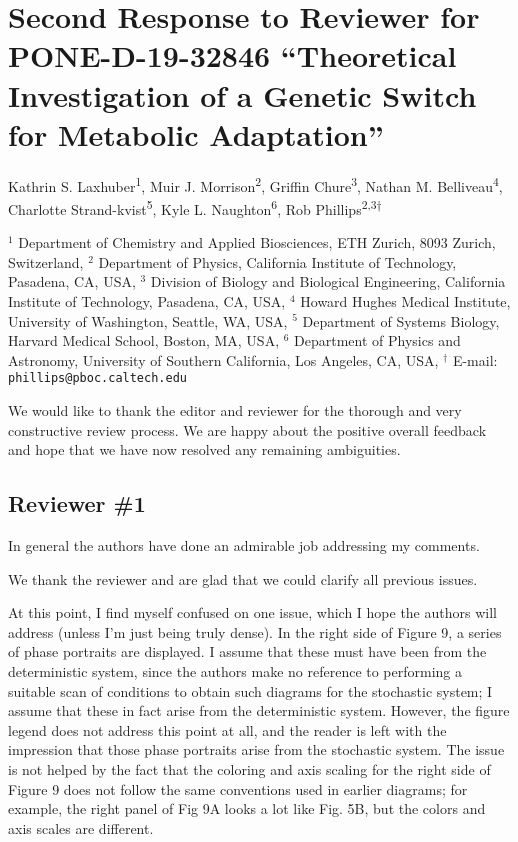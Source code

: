 \documentclass[11pt,letterpaper]{article}
\begin{document}
\section*{Second Response to Reviewer for PONE-D-19-32846 ``Theoretical Investigation of a Genetic Switch for Metabolic Adaptation''}
Kathrin S. Laxhuber\textsuperscript{1},
Muir J. Morrison\textsuperscript{2},
Griffin Chure\textsuperscript{3},
Nathan M. Belliveau\textsuperscript{4},
Charlotte Strand-kvist\textsuperscript{5},
Kyle L. Naughton\textsuperscript{6},
Rob Phillips\textsuperscript{2,3$\dagger$}
\vspace{10pt}

\noindent\tiny{
$^1$ Department of Chemistry and Applied Biosciences, ETH Zurich, 8093 Zurich, Switzerland,
$^2$ Department of Physics, California Institute of Technology, Pasadena, CA, USA,
$^3$ Division of Biology and Biological Engineering, California Institute of Technology, Pasadena, CA, USA,
$^4$ Howard Hughes Medical Institute, University of Washington, Seattle, WA, USA,
$^5$ Department of Systems Biology, Harvard Medical School, Boston, MA, USA,
$^6$ Department of Physics and Astronomy, University of Southern California, Los Angeles, CA, USA, $^\dagger$ E-mail: \texttt{phillips@pboc.caltech.edu}}

\begin{responseSummary}
We would like to thank the editor and reviewer for the thorough and very constructive review process. 
We are happy about the positive overall feedback and hope that we have now resolved any remaining ambiguities.
\end{responseSummary}

\subsection*{Reviewer \#1}
\begin{review}
	In general the authors have done an admirable job addressing my comments.
\end{review}

\begin{response}
	We thank the reviewer and are glad that we could clarify all previous issues.
\end{response}

\begin{review}
	At this point, I find myself confused on one issue, which I hope the authors will address (unless I'm just being truly dense). In the right side of Figure 9, a series of phase portraits are displayed. I assume that these must have been from the deterministic system, since the authors make no reference to performing a suitable scan of conditions to obtain such diagrams for the stochastic system; I assume that these in fact arise from the deterministic system. However, the figure legend does not address this point at all, and the reader is left with the impression that those phase portraits arise from the stochastic system. The issue is not helped by the fact that the coloring and axis scaling for the right side of Figure 9 does not follow the same conventions used in earlier diagrams; for example, the right panel of Fig 9A looks a lot like Fig. 5B, but the colors and axis scales are different.
\end{review}
\end{document}
